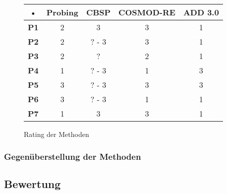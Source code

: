\begin{figure}[h] %
\caption{Rating der Methoden}
\centering
\begin{tabular}{|c|c|c|c|c|}
\hline 
\rule[-1ex]{0pt}{2.5ex} • & \textbf{Probing} & \textbf{CBSP} & \textbf{COSMOD-RE} & \textbf{ADD 3.0} \\ 
\hline 
\rule[-1ex]{0pt}{2.5ex} \textbf{P1} & 2 & 3 & 3 & 1 \\ 
\hline 
\rule[-1ex]{0pt}{2.5ex} \textbf{P2} & 2 & ? - 3 & 3 & 1 \\ 
\hline 
\rule[-1ex]{0pt}{2.5ex} \textbf{P3} & 2 & ? & 2 & 1 \\ 
\hline 
\rule[-1ex]{0pt}{2.5ex} \textbf{P4} & 1 & ? - 3 & 1 & 3 \\ 
\hline 
\rule[-1ex]{0pt}{2.5ex} \textbf{P5} & 3 & ? - 3 & 3 & 3 \\ 
\hline 
\rule[-1ex]{0pt}{2.5ex} \textbf{P6} & 3 & ? - 3 & 1 & 1 \\ 
\hline 
\rule[-1ex]{0pt}{2.5ex} \textbf{P7} & 1 & 3 & 3 & 1 \\ 
\hline 
\end{tabular} 
\label{tab:method_rating}
\end{figure}






\subsubsection{Gegenüberstellung der Methoden}





\subsection{Bewertung}